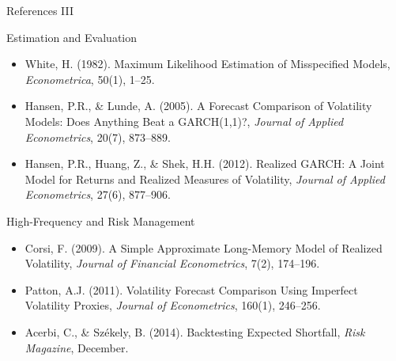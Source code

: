 \documentclass[9pt, aspectratio=169, t]{beamer}
\begin{document}
\begin{frame}{References III}
    \begin{block}{Estimation and Evaluation}
        {\small
        \begin{itemize}\setlength{\itemsep}{0pt}
            \item White, H. (1982). Maximum Likelihood Estimation of Misspecified Models, \textit{Econometrica}, 50(1), 1--25.
            \item Hansen, P.R., \& Lunde, A. (2005). A Forecast Comparison of Volatility Models: Does Anything Beat a GARCH(1,1)?, \textit{Journal of Applied Econometrics}, 20(7), 873--889.
            \item Hansen, P.R., Huang, Z., \& Shek, H.H. (2012). Realized GARCH: A Joint Model for Returns and Realized Measures of Volatility, \textit{Journal of Applied Econometrics}, 27(6), 877--906.
        \end{itemize}
        }
    \end{block}

    \begin{exampleblock}{High-Frequency and Risk Management}
        {\small
        \begin{itemize}\setlength{\itemsep}{0pt}
            \item Corsi, F. (2009). A Simple Approximate Long-Memory Model of Realized Volatility, \textit{Journal of Financial Econometrics}, 7(2), 174--196.
            \item Patton, A.J. (2011). Volatility Forecast Comparison Using Imperfect Volatility Proxies, \textit{Journal of Econometrics}, 160(1), 246--256.
            \item Acerbi, C., \& Sz\'ekely, B. (2014). Backtesting Expected Shortfall, \textit{Risk Magazine}, December.
        \end{itemize}
        }
    \end{exampleblock}
\end{frame}
\end{document}
